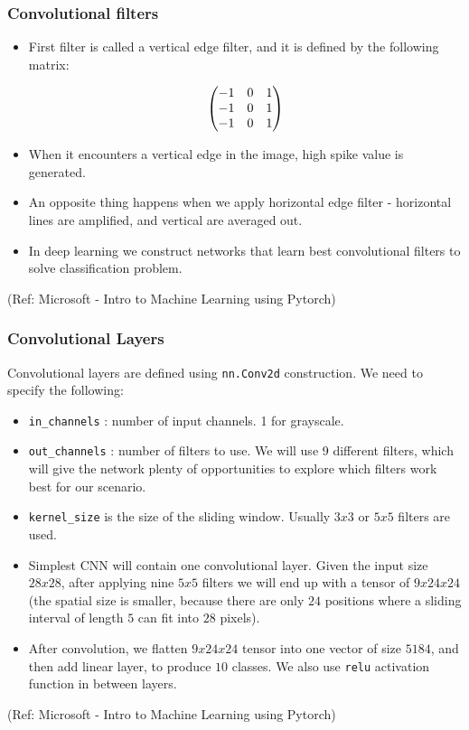 \begin{frame}[fragile] \frametitle{Convolutional filters}

\begin{itemize}
\item First filter is called a vertical edge filter, and it is defined by the following matrix:

$$
\left(
    \begin{matrix}
     -1 & 0 & 1 \cr
     -1 & 0 & 1 \cr
     -1 & 0 & 1 \cr
    \end{matrix}
\right)
$$

\item When it encounters a vertical edge in the image, high spike value is generated. 

\item An opposite thing happens when we apply horizontal edge filter - horizontal lines are amplified, and vertical are averaged out.

\item  In deep learning we construct networks that learn best convolutional filters to solve classification problem.
\end{itemize}



\tiny{(Ref: Microsoft - Intro to Machine Learning using Pytorch)}
\end{frame}

\begin{frame}[fragile] \frametitle{Convolutional Layers}

Convolutional layers are defined using \lstinline|nn.Conv2d| construction. We need to specify the following:

\begin{itemize}
\item \lstinline|in_channels| : number of input channels. 1 for grayscale.
\item \lstinline|out_channels| : number of filters to use. We will use 9 different filters, which will give the network plenty of opportunities to explore which filters work best for our scenario.

\item \lstinline|kernel_size| is the size of the sliding window. Usually $3x3$ or $5x5$ filters are used.

\item Simplest CNN will contain one convolutional layer. Given the input size $28x28$, after applying nine $5x5$ filters we will end up with a tensor of $9x24x24$ (the spatial size is smaller, because there are only $24$ positions where a sliding interval of length $5$ can fit into $28$ pixels).

\item After convolution, we flatten $9x24x24$ tensor into one vector of size $5184$, and then add linear layer, to produce $10$ classes. We also use \lstinline|relu| activation function in between layers.
\end{itemize}



\tiny{(Ref: Microsoft - Intro to Machine Learning using Pytorch)}
\end{frame}


